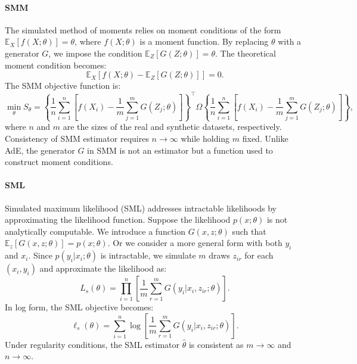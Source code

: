 \documentclass[12pt]{article}
\begin{document}
\paragraph{SMM}
The simulated method of moments relies on moment conditions of the form
\(\mathbb{E}_X[f(X; \theta)] = \theta\), where \(f(X; \theta)\) is a moment
function. By replacing \(\theta\) with a generator \(G\), we impose the
condition \(\mathbb{E}_Z[G(Z; \theta)] = \theta\). The theoretical moment
condition becomes:
\begin{equation*}
    \mathbb{E}_X\left[f(X; \theta) - \mathbb{E}_Z[G(Z; \theta)]\right] = 0.
\end{equation*}
The SMM objective function is:
\begin{equation*}
    \min_\theta S_\theta = \left\{\frac{1}{n}\sum_{i=1}^n \left[f(X_i) - \frac{1}{m} \sum_{j=1}^m G(Z_j; \theta)\right]\right\}^\top \Omega \left\{\frac{1}{n}\sum_{i=1}^n \left[f(X_i) - \frac{1}{m} \sum_{j=1}^m G(Z_j; \theta)\right]\right\},
\end{equation*}
where \(n\) and \(m\) are the sizes of the real and synthetic datasets, respectively. Consistency of SMM estimator requires $n\to\infty$ while holding $m$ fixed. Unlike AdE, the generator \(G\) in SMM is not an estimator but a function used to construct moment conditions.

\paragraph{SML}
Simulated maximum likelihood (SML) addresses intractable likelihoods by
approximating the likelihood function. Suppose the likelihood \(p(x; \theta)\)
is not analytically computable. We introduce a function \(G(x, z; \theta)\)
such that \(\mathbb{E}_z[G(x, z; \theta)] = p(x; \theta)\). Or we consider a
more general form with both $y_i$ and $x_i$. Since \(p(y_i|x_i; \theta)\) is
intractable, we simulate \(m\) draws \(z_{ir}\) for each \((x_i, y_i)\) and
approximate the likelihood as:
\begin{equation*}
    L_s(\theta) = \prod_{i=1}^n \left[\frac{1}{m} \sum_{r=1}^m G(y_i|x_i, z_{ir}; \theta)\right].
\end{equation*}
In log form, the SML objective becomes:
\begin{equation*}
    \ell_s(\theta) = \sum_{i=1}^n \log \left[\frac{1}{m} \sum_{r=1}^m G(y_i|x_i, z_{ir}; \theta)\right].
\end{equation*}
Under regularity conditions, the SML estimator \(\hat{\theta}\) is consistent as \(m \to \infty\) and \(n \to \infty\).
\end{document}
